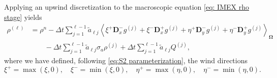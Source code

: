\documentclass[onefignum,onetabnum]{siamart220329}
\begin{document}
Applying an upwind discretization to the macroscopic equation \eqref{eq: IMEX rho stage} yields
\begin{align}
    \rho^{(\ell)} &= \rho^{n}  - \Delta t \sum_{j=1}^{\ell-1} \widetilde{a}_{\ell j} \left\langle \xi^{+} \mathbf{D}_{x}^{-} g^{(j)} + \xi^{-} \mathbf{D}_{x}^{+} g^{(j)} + \eta^{+} \mathbf{D}_{y}^{-} g^{(j)} + \eta^{-} \mathbf{D}_{y}^{+} g^{(j)} \right\rangle_{\mathbf{\Omega}} \label{eq:rho stage spatial discretization} \\
    &\qquad - \Delta t \sum_{j=1}^{\ell-1} \widetilde{a}_{\ell j} \sigma_{a} \rho^{(j)} + \Delta t \sum_{j=1}^{\ell-1} \widetilde{a}_{\ell j} Q^{(j)}, \nonumber
\end{align}
where we have defined, following \eqref{eq:S2 parameterization}, the wind directions
\begin{equation}
    \label{eq:wind directions}
    \xi^{+} = \max\left(\xi, 0\right), \quad \xi^{-} = \min\left(\xi, 0\right), \quad \eta^{+} = \max\left(\eta, 0\right), \quad \eta^{-} = \min\left(\eta, 0\right).
\end{equation}
\end{document}
